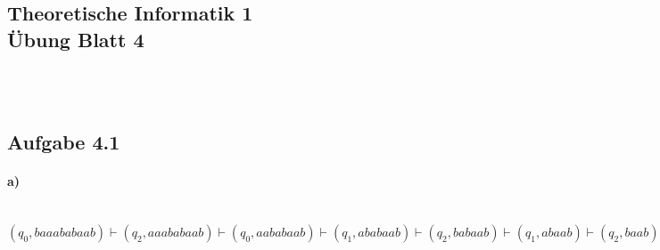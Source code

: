 \documentclass[11pt,a4paper]{article}
\begin{document}
\begin{center}
\section*{ Theoretische Informatik 1 \\ Übung Blatt 4}
\end{center}
\ \\ \ \\
\subsection*{Aufgabe 4.1}
\paragraph*{a)}\ \\
$(q_0,baaababaab) \vdash (q_2,aaababaab) \vdash (q_0,aababaab) \vdash (q_1,ababaab) \vdash (q_2,babaab) \vdash (q_1,abaab) \vdash 
(q_2,baab) \vdash (q_1,aab) \vdash (q_2,ab) \vdash (q_0,b) \vdash (q_2,\epsilon)$
\end{document}
